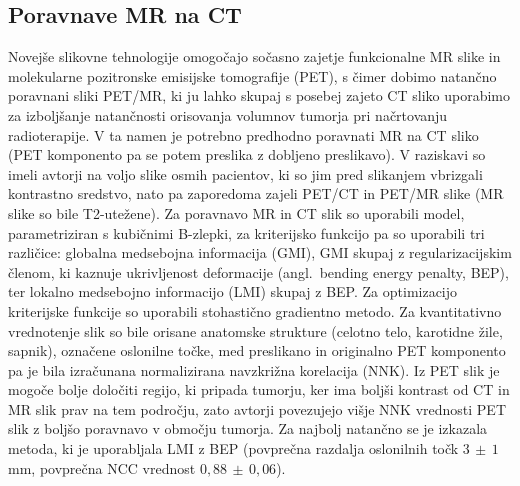\documentclass[journal]{IEEEtran}
\begin{document}
\subsection{Poravnave MR na CT}

Novejše slikovne tehnologije omogočajo sočasno zajetje funkcionalne MR slike in molekularne pozitronske emisijske tomografije (PET), s čimer dobimo natančno poravnani sliki PET/MR, ki ju lahko skupaj s posebej zajeto CT sliko uporabimo za izboljšanje natančnosti orisovanja volumnov tumorja pri načrtovanju radioterapije. V ta namen je potrebno predhodno poravnati MR na CT sliko (PET komponento pa se potem preslika z dobljeno preslikavo). V raziskavi \cite{leibfarth2013} so imeli avtorji na voljo slike osmih pacientov, ki so jim pred slikanjem vbrizgali kontrastno sredstvo, nato pa zaporedoma zajeli PET/CT in PET/MR slike (MR slike so bile T2-utežene). Za poravnavo MR in CT slik so uporabili model, parametriziran s kubičnimi B-zlepki, za kriterijsko funkcijo pa so uporabili tri različice: globalna medsebojna informacija (GMI), GMI skupaj z regularizacijskim členom, ki kaznuje ukrivljenost deformacije (angl.~bending energy penalty, BEP), ter lokalno medsebojno informacijo (LMI) skupaj z BEP. Za optimizacijo kriterijske funkcije so uporabili stohastično gradientno metodo. Za kvantitativno vrednotenje slik so bile orisane anatomske strukture (celotno telo, karotidne žile, sapnik), označene oslonilne točke, med preslikano in originalno PET komponento pa je bila izračunana normalizirana navzkrižna korelacija (NNK). Iz PET slik je mogoče bolje določiti regijo, ki pripada tumorju, ker ima boljši kontrast od CT in MR slik prav na tem področju, zato avtorji povezujejo višje NNK vrednosti PET slik z boljšo poravnavo v območju tumorja. Za najbolj natančno se je izkazala metoda, ki je uporabljala LMI z BEP (povprečna razdalja oslonilnih točk $3\,\pm\,1$ mm, povprečna NCC vrednost $0{,}88\,\pm\,0{,}06$).
\end{document}
